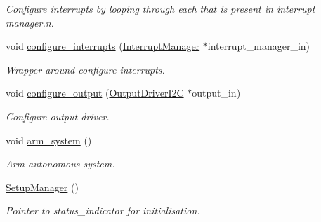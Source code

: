 \begin{DoxyCompactItemize}
\begin{DoxyCompactList}\small\item\em Configure interrupts by looping through each that is present in interrupt manager.\+n. \end{DoxyCompactList}\item 
void \hyperlink{classSPMB_1_1SetupManager_a5e594557d762d7d7b5141bb1f8cf5227}{configure\+\_\+interrupts} (\hyperlink{classSPMB_1_1InterruptManager}{Interrupt\+Manager} $\ast$interrupt\+\_\+manager\+\_\+in)\hypertarget{classSPMB_1_1SetupManager_a5e594557d762d7d7b5141bb1f8cf5227}{}\label{classSPMB_1_1SetupManager_a5e594557d762d7d7b5141bb1f8cf5227}

\begin{DoxyCompactList}\small\item\em Wrapper around configure interrupts. \end{DoxyCompactList}\item 
void \hyperlink{classSPMB_1_1SetupManager_a4e7be3a3f5e5c073a45f5059d56639eb}{configure\+\_\+output} (\hyperlink{classSPMB_1_1OutputDriverI2C}{Output\+Driver\+I2C} $\ast$output\+\_\+in)\hypertarget{classSPMB_1_1SetupManager_a4e7be3a3f5e5c073a45f5059d56639eb}{}\label{classSPMB_1_1SetupManager_a4e7be3a3f5e5c073a45f5059d56639eb}

\begin{DoxyCompactList}\small\item\em Configure output driver. \end{DoxyCompactList}\item 
void \hyperlink{classSPMB_1_1SetupManager_a3db6edae988d49263fc640148f678d38}{arm\+\_\+system} ()\hypertarget{classSPMB_1_1SetupManager_a3db6edae988d49263fc640148f678d38}{}\label{classSPMB_1_1SetupManager_a3db6edae988d49263fc640148f678d38}

\begin{DoxyCompactList}\small\item\em Arm autonomous system. \end{DoxyCompactList}\item 
\hyperlink{classSPMB_1_1SetupManager_a712e674e38b672f20d5d007e8c64d548}{Setup\+Manager} ()\hypertarget{classSPMB_1_1SetupManager_a712e674e38b672f20d5d007e8c64d548}{}\label{classSPMB_1_1SetupManager_a712e674e38b672f20d5d007e8c64d548}

\begin{DoxyCompactList}\small\item\em Pointer to status\+\_\+indicator for initialisation. \end{DoxyCompactList}\end{DoxyCompactItemize}
